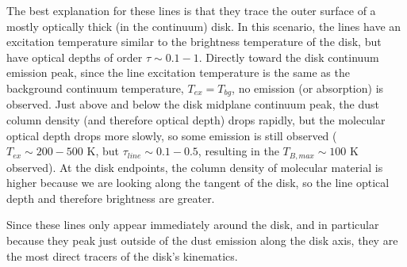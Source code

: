 \documentclass[twocolumn]{aastex61}
\begin{document}
The best explanation for these lines is that they trace the outer surface of a
mostly optically thick (in the continuum) disk.  In this scenario, the lines
have an excitation temperature similar to the brightness temperature of the
disk, but have optical depths of order $\tau\sim0.1-1$.  Directly toward the
disk continuum emission peak, since the line excitation temperature is the same
as the background continuum temperature, $T_{ex}=T_{bg}$, no emission (or
absorption) is observed.  Just above and below the disk midplane continuum
peak, the dust column density (and therefore optical depth) drops rapidly, but
the molecular optical depth drops more slowly, so some emission is still
observed ($T_{ex}\sim200-500$ K, but $\tau_{line}\sim0.1-0.5$, resulting in the
$T_{B,max} \sim 100$ K observed).  At the disk endpoints, the column density of
molecular material is higher because we are looking along the tangent of the
disk, so the line optical depth and therefore brightness are greater.

Since these lines only appear immediately around the disk, and in particular
because they peak just outside of the dust emission along the disk axis, they
are the most direct tracers of the disk's kinematics.







\end{document}
